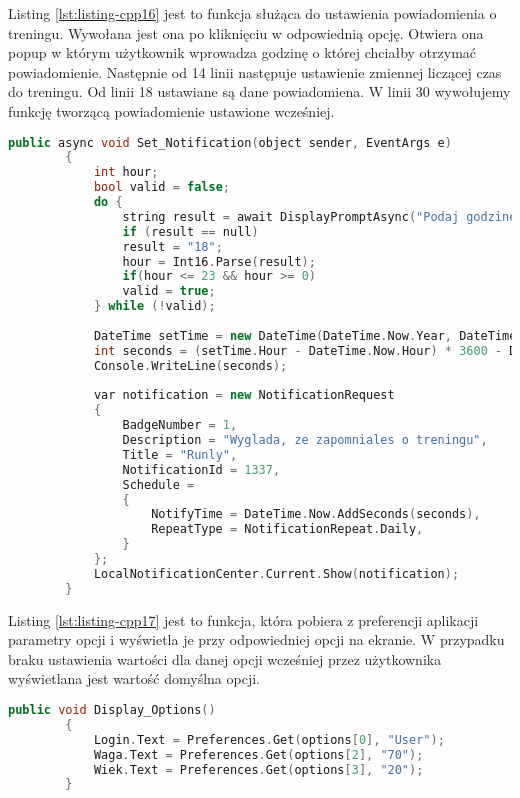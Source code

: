 	Listing \ref{lst:listing-cpp16} jest to funkcja służąca do ustawienia powiadomienia o treningu. Wywołana jest ona po kliknięciu w odpowiednią opcję. Otwiera ona popup w którym użytkownik wprowadza godzinę o której chciałby otrzymać powiadomienie. Następnie od 14 linii następuje ustawienie zmiennej liczącej czas do treningu. Od linii 18 ustawiane są dane powiadomiena. W linii 30 wywołujemy funkcję tworzącą powiadomienie ustawione wcześniej. 
	\begin{lstlisting}[caption=Ustawienie powiadomienia o treningu, label={lst:listing-cpp16}, language=C++]
		public async void Set_Notification(object sender, EventArgs e)
		{
			int hour;
			bool valid = false;
			do {
				string result = await DisplayPromptAsync("Podaj godzine. 0-23", "");
				if (result == null)
				result = "18";
				hour = Int16.Parse(result);
				if(hour <= 23 && hour >= 0)
				valid = true;
			} while (!valid);
			
			DateTime setTime = new DateTime(DateTime.Now.Year, DateTime.Now.Month, DateTime.Now.Day, hour, 0, 0);
			int seconds = (setTime.Hour - DateTime.Now.Hour) * 3600 - DateTime.Now.Minute * 60 + DateTime.Now.Second;
			Console.WriteLine(seconds);
			
			var notification = new NotificationRequest
			{
				BadgeNumber = 1,
				Description = "Wyglada, ze zapomniales o treningu",
				Title = "Runly",
				NotificationId = 1337,
				Schedule =
				{
					NotifyTime = DateTime.Now.AddSeconds(seconds),
					RepeatType = NotificationRepeat.Daily,            
				}
			};
			LocalNotificationCenter.Current.Show(notification);
		}
	\end{lstlisting}
	
	Listing \ref{lst:listing-cpp17} jest to funkcja, która pobiera z preferencji aplikacji parametry opcji i wyświetla je przy odpowiedniej opcji na ekranie. W przypadku braku ustawienia wartości dla danej opcji wcześniej przez użytkownika wyświetlana jest wartość domyślna opcji. 
	\begin{lstlisting}[caption=Wyświetlenie ustawionych opcji w widoku, label={lst:listing-cpp17}, language=C++]
		public void Display_Options()
		{
			Login.Text = Preferences.Get(options[0], "User");
			Waga.Text = Preferences.Get(options[2], "70");
			Wiek.Text = Preferences.Get(options[3], "20");
		}
	\end{lstlisting}